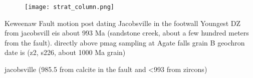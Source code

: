\documentclass[draft]{agujournal2019}
\begin{document}






\begin{figure}[h!]
\centering
\texttt{[image: strat\_column.png]}
\caption{}
\label{fig:strat_column}
\end{figure}

Keweenaw Fault motion post dating Jacobsville in the footwall
Youngest DZ from jacobsvill eis about 993 Ma (sandstone creek, about a few hundred meters from the fault). 
directly above pmag sampling at Agate falls grain B geochron date is (z2, s226, about 1000 Ma grain)

jacobsville (985.5 from calcite in the fault and <993 from zircons) 
\end{document}
